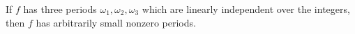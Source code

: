 If $f$ has three periods $\omega_1, \omega_2, \omega_3$ which are linearly independent over the integers, then $f$ has arbitrarily small nonzero periods.
